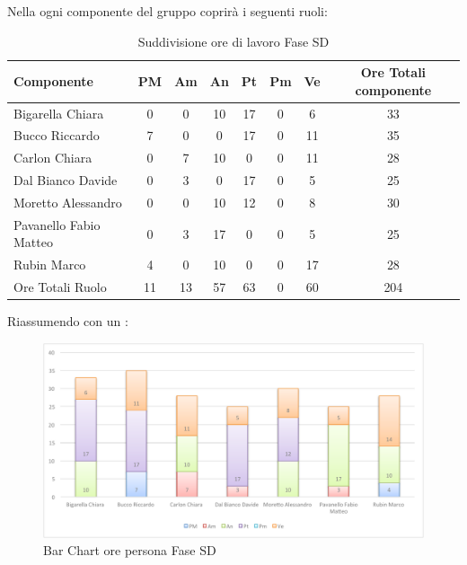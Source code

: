 				Nella  ogni componente del gruppo \groupname{} coprirà i seguenti ruoli:
				\begin{table}[H]
					\begin{center}
						\begin{tabular}{| l | c | c | c | c | c | c | c |}
							\hline
							Componente 					& PM	& Am	 & An 		& Pt 		& Pm 	& Ve 	& Ore Totali componente \\ \hline
							
							Bigarella Chiara 			& 0		& 0		& 10 		& 17 		& 0		& 6 		& 33 \\
							Bucco Riccardo 				& 7 	& 0		& 0			& 17 		& 0		& 11 		& 35 \\
							Carlon Chiara	 			& 0		& 7 	& 10 		& 0			& 0		& 11 		& 28 \\
							Dal Bianco Davide 			& 0		& 3		& 0			& 17 		& 0		& 5			& 25 \\
							Moretto Alessandro 			& 0		& 0 	& 10 		& 12 		& 0		& 8 		& 30 \\
							Pavanello Fabio Matteo	 	& 0		& 3		& 17 		& 0			& 0		& 5			& 25 \\
							Rubin Marco					& 4 	& 0		& 10 		& 0			& 0		& 17 		& 28 \\ \hline \hline
							
							Ore Totali Ruolo 			& 11 	& 13 	& 57 		& 63 		& 0		& 60		& 204\\ \hline
						\end{tabular}
					\end{center}
					\caption{Suddivisione ore di lavoro Fase SD}
				\end{table}
				Riassumendo con un :
				\begin{figure}[H]\centering
					\includegraphics[width=\textwidth]{PianoDiProgetto/Pics/ChartOreFaseSD.pdf}
					\caption{Bar Chart ore persona Fase SD}
				\end{figure}

